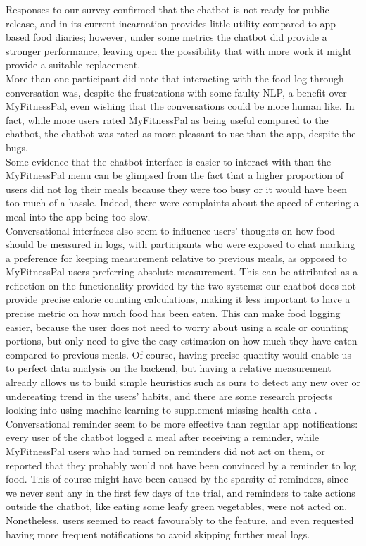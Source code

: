 Responses to our survey confirmed that the chatbot is not ready for public release, and in its current incarnation provides little utility compared to app based food diaries; however, under some metrics the chatbot did provide a stronger performance, leaving open the possibility that with more work it might provide a suitable replacement. \\
More than one participant did note that interacting with the food log through conversation was, despite the frustrations with some faulty NLP, a benefit over MyFitnessPal, even wishing that the conversations could be more human like. In fact, while more users rated MyFitnessPal as being useful compared to the chatbot, the chatbot was rated as more pleasant to use than the app, despite the bugs. \\
Some evidence that the chatbot interface is easier to interact with than the MyFitnessPal menu can be glimpsed from the fact that a higher proportion of users did not log their meals because they were too busy or it would have been too much of a hassle. Indeed, there were complaints about the speed of entering a meal into the app being too slow.\\
Conversational interfaces also seem to influence users' thoughts on how food should be measured in logs, with participants who were exposed to chat marking a preference for keeping measurement relative to previous meals, as opposed to MyFitnessPal users preferring absolute measurement. This can be attributed as a reflection on the functionality provided by the two systems: our chatbot does not provide precise calorie counting calculations, making it less important to have a precise metric on how much food has been eaten. This can make food logging easier, because the user does not need to worry about using a scale or counting portions, but only need to give the easy estimation on how much they have eaten compared to previous meals. Of course, having precise quantity would enable us to perfect data analysis on the backend, but having a relative measurement already allows us to build simple heuristics such as ours to detect any new over or undereating trend in the users' habits, and there are some research projects looking into using machine learning to supplement missing health data \cite{wolters}. \\
Conversational reminder seem to be more effective than regular app notifications: every user of the chatbot logged a meal after receiving a reminder, while MyFitnessPal users who had turned on reminders did not act on them, or reported that they probably would not have been convinced by a reminder to log food. This of course might have been caused by the sparsity of reminders, since we never sent any in the first few days of the trial, and reminders to take actions outside the chatbot, like eating some leafy green vegetables, were not acted on. Nonetheless, users seemed to react favourably to the feature, and even requested having more frequent notifications to avoid skipping further meal logs. 

